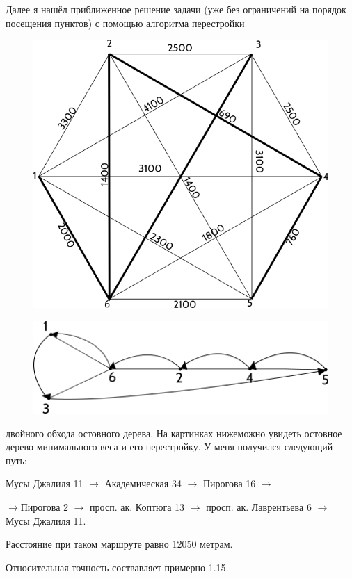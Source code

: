 \documentclass[]{article}
\begin{document}
Далее я нашёл приближенное решение задачи (уже без ограничений на порядок посещения пунктов)
с помощью алгоритма перестройки
\begin{figure}[h]
\centering
\includegraphics[scale=0.4]{graph.png}
\end{figure}
\begin{figure}[h]
\centering
\includegraphics[scale=0.4]{traverse.png}
\end{figure}
двойного обхода остовного дерева. На картинках нижеможно увидеть остовное дерево
минимального веса и его перестройку. У меня получился следующий путь:
\par
Мусы Джалиля 11 $\rightarrow$ Академическая 34 $\rightarrow$ Пирогова 16 $\rightarrow$

$\rightarrow$Пирогова 2 $\rightarrow$ просп. ак. Коптюга 13 $\rightarrow$ просп. ак. Лаврентьева 6 $\rightarrow$ Мусы Джалиля 11.
\par
Расстояние при таком маршруте равно 12050 метрам.

Относительная точность соствавляет примерно 1.15.
\end{document}

